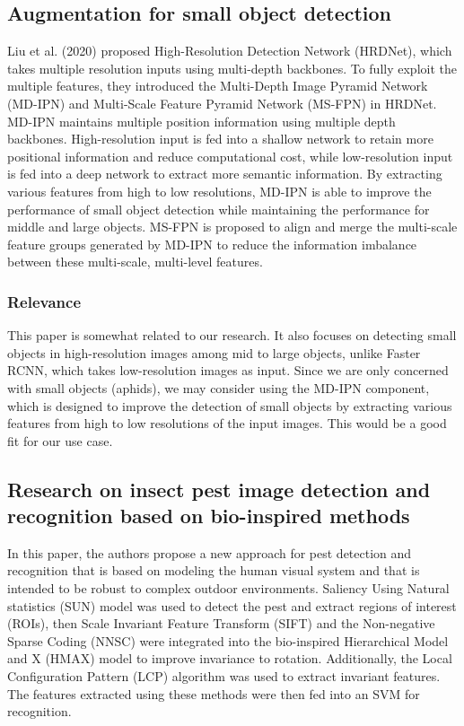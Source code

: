 \documentclass{article}
\begin{document}
\subsection*{Augmentation for small object detection \cite{AugSmallObject}}
Liu et al. (2020) proposed High-Resolution Detection Network (HRDNet), 
which takes multiple resolution inputs using multi-depth backbones. To fully exploit the multiple features, 
they introduced the Multi-Depth Image Pyramid Network (MD-IPN) and Multi-Scale Feature Pyramid Network (MS-FPN) 
in HRDNet. MD-IPN maintains multiple position information using multiple depth backbones. 
High-resolution input is fed into a shallow network to retain more positional information and reduce computational 
cost, while low-resolution input is fed into a deep network to extract more semantic information. 
By extracting various features from high to low resolutions, MD-IPN is able to improve the 
performance of small object detection while maintaining the performance for middle and large objects. 
MS-FPN is proposed to align and merge the multi-scale feature groups generated by MD-IPN to reduce the 
information imbalance between these multi-scale, multi-level features.

\subsubsection*{Relevance}
This paper is somewhat related to our research. 
It also focuses on detecting small objects in high-resolution images among mid to large objects, 
unlike Faster RCNN, which takes low-resolution images as input. Since we are only concerned with 
small objects (aphids), we may consider using the MD-IPN component, which is designed to improve the 
detection of small objects by extracting various features from high to low resolutions of the input images. 
This would be a good fit for our use case.


\subsection*{Research on insect pest image detection and recognition based on bio-inspired methods \cite{BioBasedClassical}}
In this paper, the authors propose a new approach for pest detection and recognition 
that is based on modeling the human visual system and that is intended to be robust to complex outdoor environments. 
Saliency Using Natural statistics (SUN) model was used to detect the pest and extract regions of interest (ROIs), 
then Scale Invariant Feature Transform (SIFT) and the Non-negative Sparse Coding (NNSC) 
were integrated into the bio-inspired Hierarchical Model and X (HMAX) model to improve invariance to rotation. Additionally, the Local Configuration Pattern (LCP) algorithm was used to extract invariant features. 
The features extracted using these methods were then fed into an SVM for recognition. 
\end{document}
